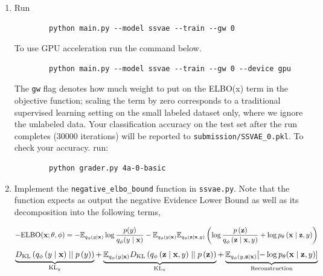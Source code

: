 \begin{enumerate}[label=(\alph*)]
    \item {} Run 
    \begin{verbatim}
        python main.py --model ssvae --train --gw 0
    \end{verbatim}

    To use GPU acceleration run the command below. 

    \begin{verbatim}
        python main.py --model ssvae --train --gw 0 --device gpu
    \end{verbatim}

    The \texttt{gw} flag denotes how much weight to put on the ELBO(x) 
    term in the objective function; scaling the term by zero corresponds to a traditional supervised learning setting 
    on the small labeled dataset only, where we ignore the unlabeled data. Your classification accuracy on the 
    test set after the run completes (30000 iterations) will be reported to \texttt{submission/SSVAE\_0.pkl}. To
    check your accuracy. run:

    \begin{verbatim}
        python grader.py 4a-0-basic
    \end{verbatim}

    \item  {} Implement the \texttt{negative\_elbo\_bound} function in \texttt{ssvae.py}. Note that the function expects
    as output the negative Evidence Lower Bound as well as its decomposition into the following terms,

    \begin{equation} \label{eq:28}
        - \text{ELBO}(\mathbf{x};\theta,\phi) = - \mathbb{E}_{q_{\phi}(y \mid \mathbf{x})} \log \frac{p(y)}{q_{\phi}(y \mid \mathbf{x})} - \mathbb{E}_{q_{\phi}(y \mid \mathbf{x})}\mathbb{E}_{q_{\phi}(\mathbf{z} \mid \mathbf{x}, y)}\left(\log \frac{p\left(\mathbf{z}\right)}{q_{\phi}\left(\mathbf{z} \mid \mathbf{x}, y\right)} + \log p_{\theta}\left(\mathbf{x} \mid \mathbf{z}, y\right)\right)
    \end{equation}
    \begin{equation} \label{eq:29}
        \underbrace{D_{\text{KL}}\left(q_{\phi}\left(y \mid \mathbf{x}\right) \mid\mid p\left(y\right)\right)}_{\text{KL}_y} + \underbrace{\mathbb{E}_{q_{\phi}(y\mid\mathbf{x})}D_{\text{KL}}\left(q_{\phi}\left(\mathbf{z} \mid \mathbf{x}, y\right) \mid\mid p\left(\mathbf{z}\right)\right)}_{\text{KL}_z} + \underbrace{\mathbb{E}_{q_{\phi}(y,\mathbf{z} \mid \mathbf{x})} [- \log p_{\theta}(\mathbf{x} \mid \mathbf{z}, y)]}_\text{Reconstruction}
    \end{equation}


\end{enumerate}
